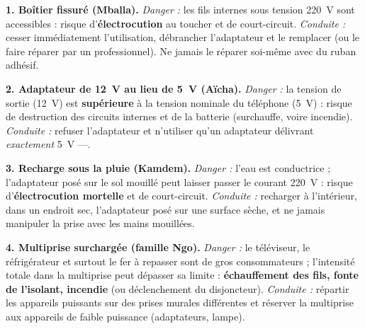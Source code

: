 \documentclass[11pt]{article}
\begin{document}
\begin{corrige}
\textbf{1. Boîtier fissuré (Mballa).} \emph{Danger :} les fils internes sous tension \SI{220}{V} sont accessibles : risque d'\textbf{électrocution} au toucher et de court-circuit. \emph{Conduite :} cesser immédiatement l'utilisation, débrancher l'adaptateur et le remplacer (ou le faire réparer par un professionnel). Ne jamais le réparer soi-même avec du ruban adhésif.

\textbf{2. Adaptateur de \SI{12}{V} au lieu de \SI{5}{V} (Aïcha).} \emph{Danger :} la tension de sortie (\SI{12}{V}) est \textbf{supérieure} à la tension nominale du téléphone (\SI{5}{V}) : risque de destruction des circuits internes et de la batterie (surchauffe, voire incendie). \emph{Conduite :} refuser l'adaptateur et n'utiliser qu'un adaptateur délivrant \emph{exactement} \SI{5}{V} $\text{---}$.

\textbf{3. Recharge sous la pluie (Kamdem).} \emph{Danger :} l'eau est conductrice ; l'adaptateur posé sur le sol mouillé peut laisser passer le courant \SI{220}{V} : risque d'\textbf{électrocution mortelle} et de court-circuit. \emph{Conduite :} recharger à l'intérieur, dans un endroit sec, l'adaptateur posé sur une surface sèche, et ne jamais manipuler la prise avec les mains mouillées.

\textbf{4. Multiprise surchargée (famille Ngo).} \emph{Danger :} le téléviseur, le réfrigérateur et surtout le fer à repasser sont de gros consommateurs ; l'intensité totale dans la multiprise peut dépasser sa limite : \textbf{échauffement des fils, fonte de l'isolant, incendie} (ou déclenchement du disjoncteur). \emph{Conduite :} répartir les appareils puissants sur des prises murales différentes et réserver la multiprise aux appareils de faible puissance (adaptateurs, lampe).
\end{corrige}
\end{document}
